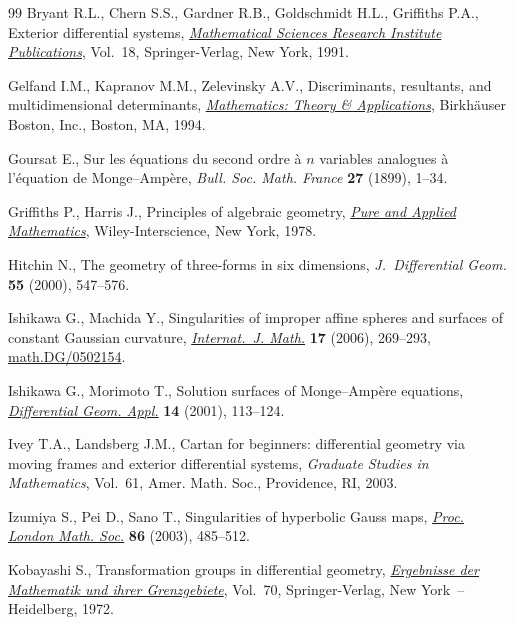 \documentclass[pdftex]{sigma}
\begin{document}
\begin{thebibliography}{99}
Bryant R.L., Chern S.S., Gardner R.B., Goldschmidt H.L., Grif\/f\/iths P.A.,
  Exterior dif\/ferential systems, \href{http://dx.doi.org/10.1007/978-1-4613-9714-4}{\textit{Mathematical Sciences Research
  Institute Publications}}, Vol.~18, Springer-Verlag, New York, 1991.

Gelfand I.M., Kapranov M.M., Zelevinsky A.V., Discriminants, resultants, and
  multidimensional determinants, \href{http://dx.doi.org/10.1007/978-0-8176-4771-1}{\textit{Mathematics: Theory \& Applications}},
  Birkh\"auser Boston, Inc., Boston, MA, 1994.

Goursat E., Sur les \'equations du second ordre \`a {$n$} variables analogues
  \`a l'\'equation de {M}onge--{A}mp\`ere, \textit{Bull. Soc. Math. France}
  \textbf{27} (1899), 1--34.

Grif\/f\/iths P., Harris J., Principles of algebraic geometry, \href{http://dx.doi.org/10.1002/9781118032527}{\textit{Pure and Applied Mathematics}}, Wiley-Interscience,
  New York, 1978.

Hitchin N., The geometry of three-forms in six dimensions,
  \textit{J.~Differential Geom.} \textbf{55} (2000), 547--576.

Ishikawa G., Machida Y., Singularities of improper af\/f\/ine spheres and surfaces
  of constant {G}aussian curvature, \href{http://dx.doi.org/10.1142/S0129167X06003485}{\textit{Internat.~J. Math.}} \textbf{17}
  (2006), 269--293, \href{http://arxiv.org/abs/math.DG/0502154}{math.DG/0502154}.

Ishikawa G., Morimoto T., Solution surfaces of {M}onge--{A}mp\`ere equations,
  \href{http://dx.doi.org/10.1016/S0926-2245(01)00033-X}{\textit{Differential Geom. Appl.}} \textbf{14} (2001), 113--124.

Ivey T.A., Landsberg J.M., Cartan for beginners: dif\/ferential geometry via
  moving frames and exterior dif\/ferential systems, \textit{Graduate Studies in
  Mathematics}, Vol.~61, Amer. Math. Soc., Providence, RI, 2003.

Izumiya S., Pei D., Sano T., Singularities of hyperbolic {G}auss maps,
  \href{http://dx.doi.org/10.1112/S0024611502013850}{\textit{Proc. London Math. Soc.}} \textbf{86} (2003), 485--512.

Kobayashi S., Transformation groups in dif\/ferential geometry, \href{http://dx.doi.org/10.1007/978-3-642-61981-6}{\textit{Ergebnisse der Mathematik und
  ihrer Grenz\-gebiete}}, Vol.~70,
  Springer-Verlag, New York~-- Heidelberg, 1972.


\end{thebibliography}
\end{document}
